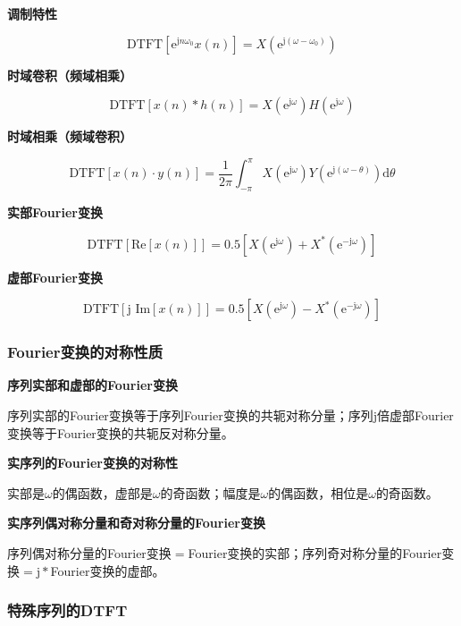 \documentclass[cn, hazy, blue, normal, 12pt]{elegantnote}
\begin{document}
\textbf{调制特性}

\begin{equation}
    \text{DTFT}[\text{e}^{\text{j}n\omega_0}x(n)]=X(\text{e}^{\text{j}(\omega-\omega_0)})
\end{equation}

\textbf{时域卷积（频域相乘）}

\begin{equation}
    \text{DTFT}[x(n)\ast h(n)]=X(\text{e}^{\text{j}\omega})H(\text{e}^{\text{j}\omega})
\end{equation}

\textbf{时域相乘（频域卷积）}

\begin{equation}
    \text{DTFT}[x(n)\cdot y(n)]=\frac{1}{2\pi}\int_{-\pi}^{\pi}{X(\text{e}^{\text{j}\omega})Y(\text{e}^{\text{j}(\omega-\theta)})\text{d}\theta}
\end{equation}

\textbf{实部Fourier变换}

\begin{equation}
    \text{DTFT}[\text{Re}[x(n)]]=0.5[X(\text{e}^{\text{j}\omega})+X^*(\text{e}^{-\text{j}\omega})]
\end{equation}

\textbf{虚部Fourier变换}

\begin{equation}
    \text{DTFT}[\text{j } \text{Im}[x(n)]]=0.5[X(\text{e}^{\text{j}\omega})-X^*(\text{e}^{-\text{j}\omega})]
\end{equation}

\subsubsection{Fourier变换的对称性质}

\textbf{序列实部和虚部的Fourier变换}

序列实部的Fourier变换等于序列Fourier变换的共轭对称分量；序列$\text{j}$倍虚部Fourier变换等于Fourier变换的共轭反对称分量。

\textbf{实序列的Fourier变换的对称性}

实部是$\omega$的偶函数，虚部是$\omega$的奇函数；幅度是$\omega$的偶函数，相位是$\omega$的奇函数。

\textbf{实序列偶对称分量和奇对称分量的Fourier变换}

序列偶对称分量的Fourier变换$=$Fourier变换的实部；序列奇对称分量的Fourier变换$=\text{j}*$Fourier变换的虚部。

\subsubsection{特殊序列的DTFT}
\end{document}

